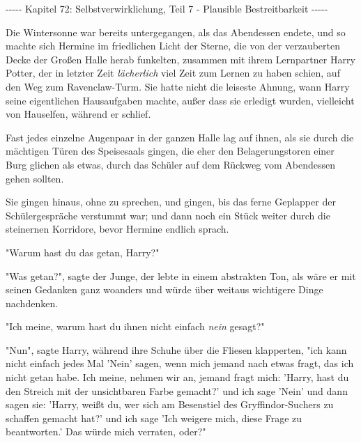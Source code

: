 

\hypertarget{selbstverwirklichung-teil-7---plausible-bestreitbarkeit}{%

-\/-\/-\/-\/- Kapitel 72: Selbstverwirklichung, Teil 7 - Plausible Bestreitbarkeit -\/-\/-\/-\/-

Die Wintersonne war bereits untergegangen, als das Abendessen endete, und so machte sich Hermine im friedlichen Licht der Sterne, die von der verzauberten Decke der Großen Halle herab funkelten, zusammen mit ihrem Lernpartner Harry Potter, der in letzter Zeit \emph{lächerlich} viel Zeit zum Lernen zu haben schien, auf den Weg zum Ravenclaw-Turm. Sie hatte nicht die leiseste Ahnung, wann Harry seine eigentlichen Hausaufgaben machte, außer dass sie erledigt wurden, vielleicht von Hauselfen, während er schlief.

Fast jedes einzelne Augenpaar in der ganzen Halle lag auf ihnen, als sie durch die mächtigen Türen des Speisesaals gingen, die eher den Belagerungstoren einer Burg glichen als etwas, durch das Schüler auf dem Rückweg vom Abendessen gehen sollten.

Sie gingen hinaus, ohne zu sprechen, und gingen, bis das ferne Geplapper der Schülergespräche verstummt war; und dann noch ein Stück weiter durch die steinernen Korridore, bevor Hermine endlich sprach.

"Warum hast du das getan, Harry?"

"Was getan?", sagte der Junge, der lebte in einem abstrakten Ton, als wäre er mit seinen Gedanken ganz woanders und würde über weitaus wichtigere Dinge nachdenken.

"Ich meine, warum hast du ihnen nicht einfach \emph{nein} gesagt?"

"Nun", sagte Harry, während ihre Schuhe über die Fliesen klapperten, "ich kann nicht einfach jedes Mal 'Nein' sagen, wenn mich jemand nach etwas fragt, das ich nicht getan habe. Ich meine, nehmen wir an, jemand fragt mich: 'Harry, hast du den Streich mit der unsichtbaren Farbe gemacht?' und ich sage 'Nein' und dann sagen sie: 'Harry, weißt du, wer sich am Besenstiel des Gryffindor-Suchers zu schaffen gemacht hat?' und ich sage 'Ich weigere mich, diese Frage zu beantworten.' Das würde mich verraten, oder?"

}
